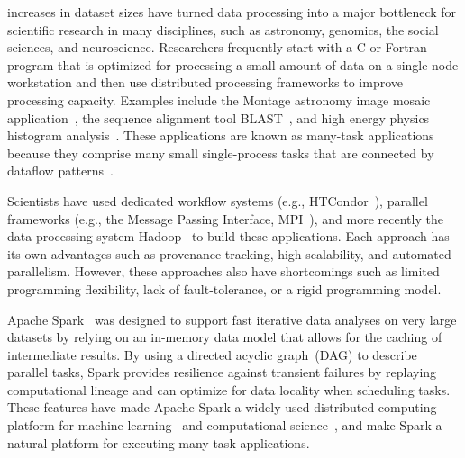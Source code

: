 \documentclass[10pt,journal,compsoc]{IEEEtran}
\begin{document}
% 
% 
% 
% 
 increases in dataset sizes have turned data processing into a major bottleneck for scientific research in many disciplines, such as astronomy, genomics, the social sciences, and neuroscience.
Researchers frequently start with a C or Fortran program that is optimized for processing a small amount of data on a single-node workstation and then use distributed processing frameworks to improve processing capacity. Examples include the Montage astronomy image mosaic application~\cite{jacob09},  the sequence alignment tool BLAST~\cite{altschul90}, and high energy physics histogram analysis~\cite{ekanayake08}.
These applications are known as many-task applications because they comprise many small single-process tasks that are connected by dataflow patterns~\cite{raicu08}.

Scientists have used dedicated workflow systems (e.g., HTCondor~\cite{litzkow88}), parallel frameworks (e.g., the Message Passing Interface, MPI~\cite{gropp96}), and more recently the data processing system Hadoop~\cite{HADOOP} to build these applications. Each approach has its own advantages such as provenance tracking, high scalability, and automated parallelism. However, these approaches also have shortcomings such as limited programming flexibility, lack of fault-tolerance, or a rigid programming model.


Apache Spark~\cite{zaharia12} was designed to support fast iterative data analyses on very large datasets by relying on an in-memory data model that allows
for the caching of intermediate results. By using a directed acyclic graph~(DAG) to describe parallel tasks, 
Spark provides resilience against transient failures by replaying computational lineage
and can optimize for data locality when scheduling tasks.
These features have made Apache Spark a widely used distributed computing platform for machine learning~\cite{gonzalez14, sparks13} and computational science~\cite{freeman14, massie13, nothaft15}, and
make Spark a natural platform for executing many-task applications.
\end{document}
